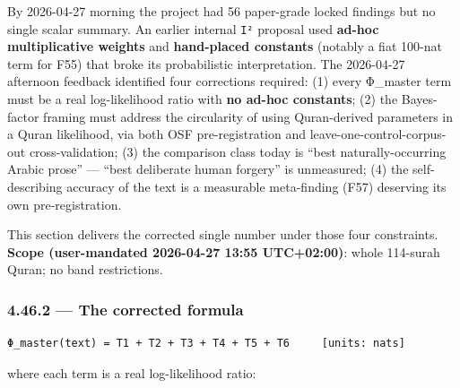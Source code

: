 \documentclass[
]{article}
\begin{document}
By 2026-04-27 morning the project had 56 paper-grade locked findings but
no single scalar summary. An earlier internal \texttt{I²} proposal used
\textbf{ad-hoc multiplicative weights} and \textbf{hand-placed
constants} (notably a fiat 100-nat term for F55) that broke its
probabilistic interpretation. The 2026-04-27 afternoon feedback
identified four corrections required: (1) every Φ\_master term must be a
real log-likelihood ratio with \textbf{no ad-hoc constants}; (2) the
Bayes-factor framing must address the circularity of using Quran-derived
parameters in a Quran likelihood, via both OSF pre-registration and
leave-one-control-corpus-out cross-validation; (3) the comparison class
today is ``best naturally-occurring Arabic prose'' --- ``best deliberate
human forgery'' is unmeasured; (4) the self-describing accuracy of the
text is a measurable meta-finding (F57) deserving its own
pre-registration.

This section delivers the corrected single number under those four
constraints. \textbf{Scope (user-mandated 2026-04-27 13:55 UTC+02:00)}:
whole 114-surah Quran; no band restrictions.

\subsubsection{4.46.2 --- The corrected
formula}\label{the-corrected-formula}

\begin{verbatim}
Φ_master(text) = T1 + T2 + T3 + T4 + T5 + T6     [units: nats]
\end{verbatim}

where each term is a real log-likelihood ratio:
\end{document}
